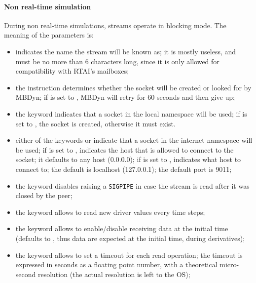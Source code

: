 \paragraph{Non real-time simulation}
During non real-time simulations, streams operate in blocking mode.
The meaning of the parameters is:
\begin{itemize}
\item {} indicates the name the stream will be known as;
it is mostly useless, and must be no more than 6 characters long,
since it is only allowed for compatibility with RTAI's mailboxes;

\item the instruction  determines whether the socket will be
created or looked for by MBDyn; if  is set to ,
MBDyn will retry for 60 seconds and then give up;

\item the keyword  indicates that a socket 
in the local namespace will be used; if  is set to ,
the socket is created, otherwise it must exist.

\item either of the keywords  or  indicate that a socket
in the internet namespace will be used;
if  is set to ,  indicates 
the host that is allowed to connect to the socket; it defaults 
to any host (0.0.0.0); if  is set to ,
 indicates what host to connect to; the default 
is localhost (127.0.0.1); the default port is 9011;

\item the keyword  disables raising a \texttt{SIGPIPE}
in case the stream is read after it was closed by the peer;

\item the keyword  allows to read new driver values
every  time steps;

\item the keyword  allows to enable/disable
receiving data at the initial time (defaults to ,
thus data are expected at the initial time, during derivatives);

\item the keyword  allows to set a timeout
for each read operation; the timeout is expressed in seconds
as a floating point number, with a theoretical micro-second resolution
(the actual resolution is left to the OS);


\end{itemize}
